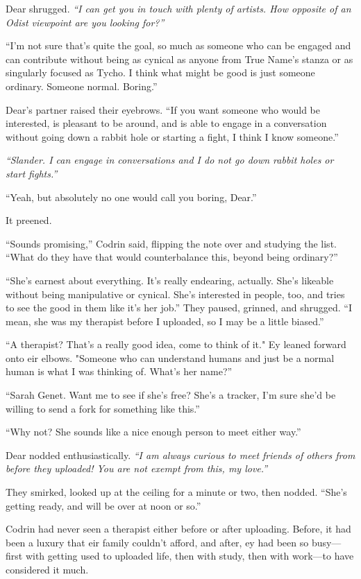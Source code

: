 Dear shrugged. \emph{``I can get you in touch with plenty of artists. How opposite of an Odist viewpoint are you looking for?''}

``I'm not sure that's quite the goal, so much as someone who can be engaged and can contribute without being as cynical as anyone from True Name's stanza or as singularly focused as Tycho. I think what might be good is just someone ordinary. Someone normal. Boring.''

Dear's partner raised their eyebrows. ``If you want someone who would be interested, is pleasant to be around, and is able to engage in a conversation without going down a rabbit hole or starting a fight, I think I know someone.''

\emph{``Slander. I can engage in conversations and I do not go down rabbit holes or start fights.''}

``Yeah, but absolutely no one would call you boring, Dear.''

It preened.

``Sounds promising,'' Codrin said, flipping the note over and studying the list. ``What do they have that would counterbalance this, beyond being ordinary?''

``She's earnest about everything. It's really endearing, actually. She's likeable without being manipulative or cynical. She's interested in people, too, and tries to see the good in them like it's her job.'' They paused, grinned, and shrugged. ``I mean, she was my therapist before I uploaded, so I may be a little biased.''

``A therapist? That's a really good idea, come to think of it." Ey leaned forward onto eir elbows. "Someone who can understand humans and just be a normal human is what I was thinking of. What's her name?''

``Sarah Genet. Want me to see if she's free? She's a tracker, I'm sure she'd be willing to send a fork for something like this.''

``Why not? She sounds like a nice enough person to meet either way.''

Dear nodded enthusiastically. \emph{``I am always curious to meet friends of others from before they uploaded! You are not exempt from this, my love.''}

They smirked, looked up at the ceiling for a minute or two, then nodded. ``She's getting ready, and will be over at noon or so.''

Codrin had never seen a therapist either before or after uploading. Before, it had been a luxury that eir family couldn't afford, and after, ey had been so busy—first with getting used to uploaded life, then with study, then with work—to have considered it much.

